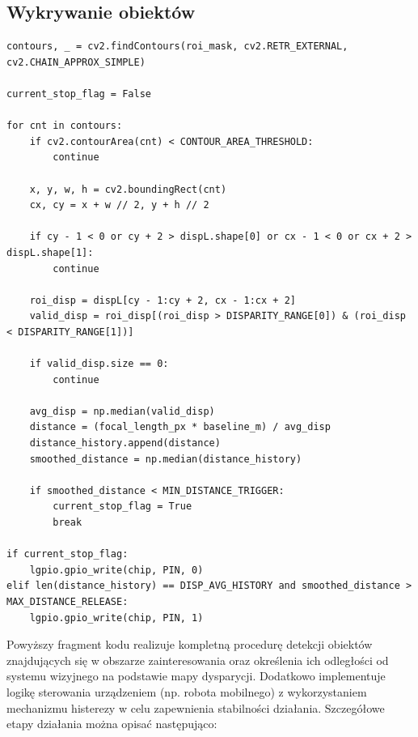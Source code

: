 \documentclass[magisterska]{pracadypl}
\begin{document}
\subsection*{Wykrywanie obiektów}

\begin{lstlisting}[style=mypython]
contours, _ = cv2.findContours(roi_mask, cv2.RETR_EXTERNAL, cv2.CHAIN_APPROX_SIMPLE)

current_stop_flag = False

for cnt in contours:
    if cv2.contourArea(cnt) < CONTOUR_AREA_THRESHOLD:
        continue

    x, y, w, h = cv2.boundingRect(cnt)
    cx, cy = x + w // 2, y + h // 2

    if cy - 1 < 0 or cy + 2 > dispL.shape[0] or cx - 1 < 0 or cx + 2 > dispL.shape[1]:
        continue

    roi_disp = dispL[cy - 1:cy + 2, cx - 1:cx + 2]
    valid_disp = roi_disp[(roi_disp > DISPARITY_RANGE[0]) & (roi_disp < DISPARITY_RANGE[1])]

    if valid_disp.size == 0:
        continue

    avg_disp = np.median(valid_disp)
    distance = (focal_length_px * baseline_m) / avg_disp
    distance_history.append(distance)
    smoothed_distance = np.median(distance_history)

    if smoothed_distance < MIN_DISTANCE_TRIGGER:
        current_stop_flag = True
        break

if current_stop_flag:
    lgpio.gpio_write(chip, PIN, 0)
elif len(distance_history) == DISP_AVG_HISTORY and smoothed_distance > MAX_DISTANCE_RELEASE:
    lgpio.gpio_write(chip, PIN, 1)
\end{lstlisting}

Powyższy fragment kodu realizuje kompletną procedurę detekcji obiektów znajdujących się w obszarze zainteresowania oraz określenia ich odległości od systemu wizyjnego na podstawie mapy dysparycji. Dodatkowo implementuje logikę sterowania urządzeniem (np. robota mobilnego) z wykorzystaniem mechanizmu histerezy w celu zapewnienia stabilności działania. Szczegółowe etapy działania można opisać następująco:
\end{document}
